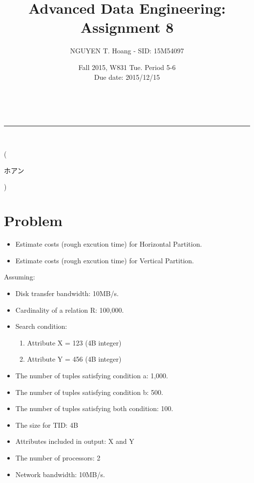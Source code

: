 \documentclass[a4paper,12pt]{article}
\makeatletter
\newcommand{\linia}{\rule{\linewidth}{0.5pt}}
\renewcommand{\maketitle} {
\begin{center}
\vspace{2ex}
{\LARGE \textsc{\@title}}
\vspace{1ex}
\\
\linia\\
\@author \hfill \@date
\vspace{4ex}
\end{center}
}
\makeatother
\begin{document}
\title{Advanced Data Engineering: Assignment 8}

\author{NGUYEN T. Hoang - SID: 15M54097}

\date{Fall 2015, W831 Tue. Period 5-6 \\ \hfill Due date: 2015/12/15}

\maketitle
\vspace{-4.5em}
\hspace{5.3em} (\begin{CJK}{UTF8}{min}ホアン\end{CJK})
\vspace{8em}
\section*{Problem}
\begin{itemize}
	\item Estimate costs (rough excution time) for Horizontal Partition.
	\item Estimate costs (rough excution time) for Vertical Partition.
\end{itemize}
Assuming:
\begin{itemize}
	\setlength{\parskip}{0cm}
	\setlength{\itemsep}{0cm}
	\item Disk transfer bandwidth: 10MB/s.
	\item Cardinality of a relation R: 100,000.
	\item Search condition:
	\begin{enumerate}[label=(\alph*)]
		\setlength{\parskip}{0cm}
		\setlength{\itemsep}{0cm}
		\item Attribute X = 123 (4B integer)
		\item Attribute Y = 456 (4B integer)
	\end{enumerate}
	\item The number of tuples satisfying condition a: 1,000.
	\item The number of tuples satisfying condition b: 500.
	\item The number of tuples satisfying both condition: 100.
	\item The size for TID: 4B
	\item Attributes included in output: X and Y
	\item The number of processors: 2
	\item Network bandwidth: 10MB/s.
\end{itemize}
\end{document}
